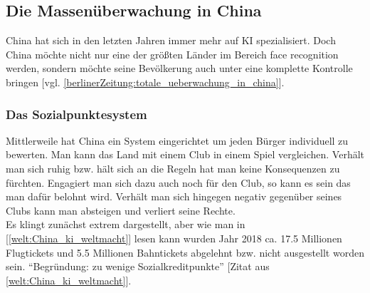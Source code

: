     \subsection{Die Massenüberwachung in China}
        China hat sich in den letzten Jahren immer mehr auf KI spezialisiert. Doch China möchte nicht nur eine der größten Länder im Bereich face recognition werden, sondern möchte seine Bevölkerung auch unter eine komplette Kontrolle bringen [vgl. \ref{berlinerZeitung:totale_ueberwachung_in_china}].

        \subsubsection{Das Sozialpunktesystem}
            Mittlerweile hat China ein System eingerichtet um jeden Bürger individuell zu bewerten. Man kann das Land mit einem Club in einem Spiel vergleichen. Verhält man sich ruhig bzw. hält sich an die Regeln hat man keine Konsequenzen zu fürchten. Engagiert man sich dazu auch noch für den Club, so kann es sein das man dafür belohnt wird. Verhält man sich hingegen negativ gegenüber seines Clubs kann man absteigen und verliert seine Rechte.\\
            Es klingt zunächst extrem dargestellt, aber wie man in [\ref{welt:China_ki_weltmacht}] lesen kann wurden Jahr 2018 ca. 17.5 Millionen Flugtickets und 5.5 Millionen Bahntickets abgelehnt bzw. nicht ausgestellt worden sein. \enquote{Begründung: zu wenige Sozialkreditpunkte} [Zitat aus \ref{welt:China_ki_weltmacht}]. 
